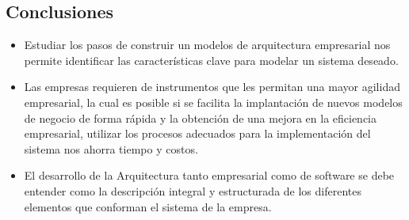 \documentclass[12pt]{article}
\begin{document}



\subsection{Conclusiones}
\begin{itemize}
    \item Estudiar los pasos de construir un modelos de arquitectura empresarial nos permite identificar las características clave para modelar un sistema deseado.
    
    \item Las empresas requieren de instrumentos que les permitan una mayor agilidad empresarial, la cual es posible si se facilita la implantación de nuevos modelos de negocio de forma rápida y la obtención de una mejora en la eficiencia empresarial, utilizar los procesos adecuados para la implementación del sistema nos ahorra tiempo y costos.
    
    \item El desarrollo de la Arquitectura tanto empresarial como de software se debe entender como la descripción integral y estructurada de los diferentes elementos que conforman el sistema de la empresa.
\end{itemize}












%
%





\end{document}
